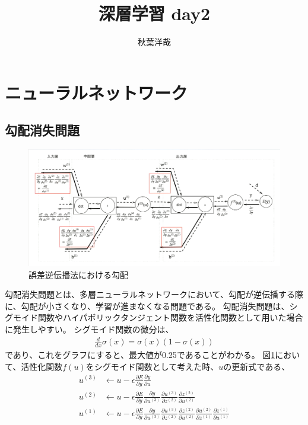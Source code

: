 \documentclass{ltjsarticle}
\begin{document}
\title{深層学習 day2}
\author{秋葉洋哉}
\maketitle

\section{ニューラルネットワーク}
\subsection{勾配消失問題}
\begin{figure}[htbp]
  \centering
  \includegraphics[width=13cm]{./capture/backprop.png}
  \caption{誤差逆伝播法における勾配}
  \label{fig:backprop}
\end{figure}
勾配消失問題とは、多層ニューラルネットワークにおいて、勾配が逆伝播する際に、勾配が小さくなり、学習が進まなくなる問題である。
勾配消失問題は、シグモイド関数やハイパボリックタンジェント関数を活性化関数として用いた場合に発生しやすい。
シグモイド関数の微分は、
\begin{align}
  \frac{d}{dx}\sigma(x) = \sigma(x)(1 - \sigma(x))
\end{align}
であり、これをグラフにすると、最大値が0.25であることがわかる。
図\ref{fig:backprop}において、活性化関数$f(u)$をシグモイド関数として考えた時、$u$の更新式である、
\begin{align}
  u^{(3)} &\leftarrow u - \epsilon \frac{\partial E}{\partial y}\frac{\partial y}{\partial u}\\
  u^{(2)} &\leftarrow u - \epsilon \frac{\partial E}{\partial y}\frac{\partial y}{\partial u^{(3)}} \frac{\partial u^{(3)}}{\partial z^{(2)}} \frac{\partial z^{(2)}}{\partial u^{(2)}}\\
  u^{(1)} &\leftarrow u - \epsilon \frac{\partial E}{\partial y} \frac{\partial y}{\partial u^{(3)}} \frac{\partial u^{(3)}}{\partial z^{(2)}} \frac{\partial z^{(2)}}{\partial u^{(2)}} \frac{\partial u^{(2)}}{\partial z^{(1)}} \frac{\partial z^{(1)}}{\partial u^{(1)}}
\end{align}
\end{document}
